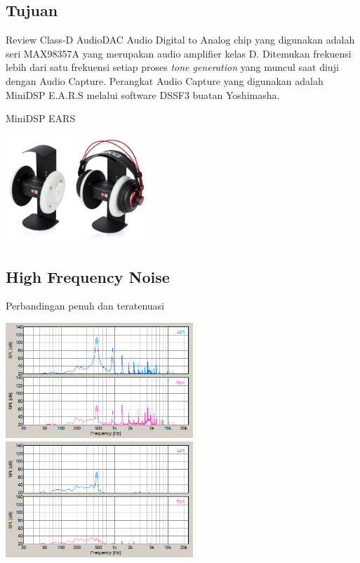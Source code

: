 \documentclass[table,dvipsnames]{beamer}
\begin{document}
	\begin{frame}
		\subsection{Tujuan}
		\begin{exampleblock}{Review Class-D AudioDAC}
			Audio Digital to Analog chip yang digunakan adalah seri MAX98357A yang merupakan audio amplifier kelas D.
			Ditemukan frekuensi lebih dari satu frekuensi setiap proses \textit{tone generation} yang muncul saat diuji dengan Audio Capture.
			Perangkat Audio Capture yang digunakan adalah MiniDSP E.A.R.S melalui software DSSF3 buatan Yoshimasha.
		\end{exampleblock}
	
		\begin{exampleblock}{MiniDSP EARS}
			\begin{center}
				\includegraphics[width=150pt]{images/ears}
			\end{center}
		\end{exampleblock}
	\end{frame}

	\begin{frame}
		\subsection{High Frequency Noise}
		\begin{exampleblock}{Perbandingan penuh dan teratenuasi}
			\begin{center}
				\includegraphics[width=200pt]{images/notattenuated}
				\includegraphics[width=200pt]{images/attenuated}
			\end{center}
		\end{exampleblock}
	\end{frame}
	
\end{document}
